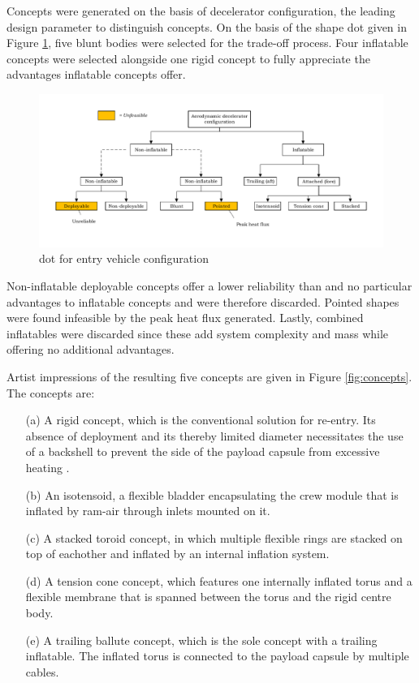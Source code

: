 Concepts were generated on the basis of decelerator configuration, the leading design parameter to distinguish concepts. On the basis of the shape \gls{dot} given in Figure \ref{fig:dotshape}, five blunt bodies were selected for the trade-off process. Four inflatable concepts were selected alongside one rigid concept to fully appreciate the advantages inflatable concepts offer.

\begin{figure}[h]
\hspace{-23mm}
\includegraphics[width = 1.25\textwidth]{Figure/Concepts/DOT_configuration.pdf}
\vspace{-5mm}
\caption{\acrlong{dot} for entry vehicle configuration}
\label{fig:dotshape}
\end{figure}

Non-inflatable deployable concepts offer a lower reliability than and no particular advantages to inflatable concepts and were therefore discarded. Pointed shapes were found infeasible by the peak heat flux generated. Lastly, combined inflatables were discarded since these add system complexity and mass while offering no additional advantages. 

Artist impressions of the resulting five concepts are given in Figure \ref{fig:concepts}. The concepts are:
\begin{itemize}
\item[(a)] A rigid concept, which is the conventional solution for re-entry. Its absence of deployment and its thereby limited diameter necessitates the use of a backshell to prevent the side of the payload capsule from excessive heating \cite{Hughes2005}.
\item[(b)] An isotensoid, a flexible bladder encapsulating the crew module that is inflated by ram-air through inlets mounted on it.
\item[(c)] A stacked toroid concept, in which multiple flexible rings are stacked on top of eachother and inflated by an internal inflation system.
\item[(d)] A tension cone concept, which features one internally inflated torus and a flexible membrane that is spanned between the torus and the rigid centre body.
\item[(e)] A trailing ballute concept, which is the sole concept with a trailing inflatable. The inflated torus is connected to the payload capsule by multiple cables.
\end{itemize}

